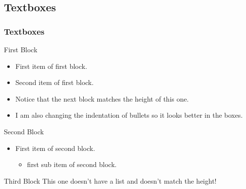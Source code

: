 \documentclass[
	10pt, %
	aspectratio=169, %
]{beamer}
\begin{document}
\subsection{Textboxes}
\begin{frame}
	\frametitle{Textboxes}
	\centering
	\begin{minipage}{0.3\linewidth}
		\begin{primaryblock}[equal height group=A,label=block:first]{First Block}
			\setlength{\leftmargini}{8pt}
			\begin{itemize}
				\item First item of first block.
				\item Second item of first block.
				\item Notice that the next block matches the height of this one.
				\item I am also changing the indentation of bullets so it looks better in the boxes.
			\end{itemize}
		\end{primaryblock}
	\end{minipage}
	\begin{minipage}{0.3\linewidth}
		\begin{secondaryblock}[equal height group=A]{Second Block}
			\setlength{\leftmargini}{8pt}
			\begin{itemize}
				\item First item of second block.
				      \begin{itemize}
					      \item first sub item of second block.
				      \end{itemize}
			\end{itemize}
		\end{secondaryblock}
	\end{minipage}
	\begin{minipage}{0.3\linewidth}
		\begin{primaryblock}[]{Third Block}
			This one doesn't have a list and doesn't match the height!
		\end{primaryblock}
	\end{minipage}
\end{frame}
\end{document}
